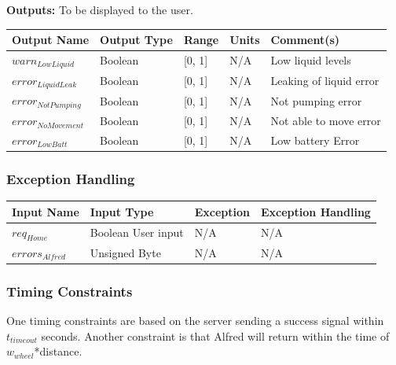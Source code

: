\documentclass [10pt]{article}
\begin{document}
\textbf{Outputs: } To be displayed to the user.\\
\begin{longtable}{|l|l|l|l|l|}\hline 
	\rowcolor{tableCell}\textbf{Output Name} & \textbf{Output Type} & \textbf{Range} & \textbf{Units} & \textbf{Comment(s)} \\ \hline
	$  warn_{LowLiquid} $ & Boolean & [0, 1]& N/A & Low liquid levels \\ \hline
	\rowcolor{tableCell}$  error_{LiquidLeak} $ & Boolean & [0, 1]& N/A & Leaking of liquid error \\ \hline
	$  error_{NotPumping} $ & Boolean & [0, 1]& N/A & Not pumping error \\ \hline
	\rowcolor{tableCell}$  error_{NoMovement} $ & Boolean & [0, 1]& N/A & Not able to move error \\ \hline
	$  error_{LowBatt} $ & Boolean & [0, 1]& N/A & Low battery Error \\ \hline
\end{longtable}


\subsubsection{Exception Handling}

\begin{longtable}{|l|l|l|l|}\hline 
	\rowcolor{tableCell}\textbf{Input Name} & \textbf{Input Type} & \textbf{Exception} & \textbf{Exception Handling} \\ \hline
	$ req_{Home} $ & Boolean User input & N/A & N/A \\ \hline
	\rowcolor{tableCell}$  errors_{Alfred} $ & Unsigned Byte & N/A & N/A \\ \hline
\end{longtable}


\subsubsection{Timing Constraints}
One timing constraints are based on the server sending a success signal within  $ t_{timeout} $ seconds. Another constraint is that Alfred will return within the time of $ w_{wheel} $*distance.
\end{document}
